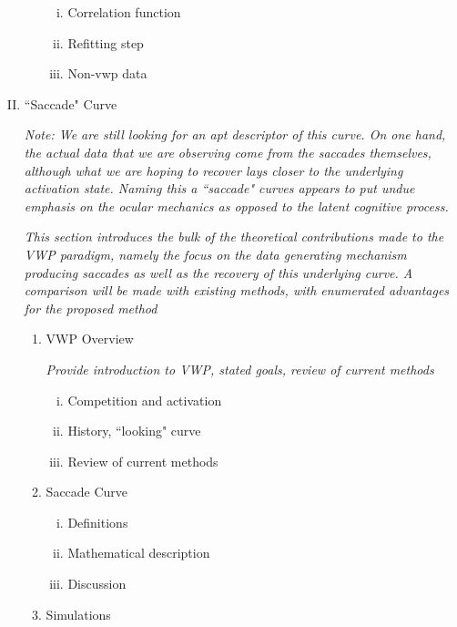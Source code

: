\documentclass[12pt, letterpaper, twoside]{article}
\begin{document}
\begin{enumerate}[I.]
\begin{enumerate}[1.]
    \begin{enumerate}[i.]
    \item Correlation function
    \item Refitting step
    \item Non-vwp data
    \end{enumerate}
  \end{enumerate}
\item ``Saccade" Curve

\textit{Note: We are still looking for an apt descriptor of this curve. On one hand, the actual data that we are observing come from the saccades themselves, although what we are hoping to recover lays closer to the underlying activation state. Naming this a ``saccade" curves appears to put undue emphasis on the ocular mechanics as opposed to the latent cognitive process. } 

\textit{This section introduces the bulk of the theoretical contributions made to the VWP paradigm, namely the focus on the data generating mechanism producing saccades as well as the recovery of this underlying curve. A comparison will be made with existing methods, with enumerated advantages for the proposed method}

  \begin{enumerate}[1.]
  \item VWP Overview

\textit{Provide introduction to VWP, stated goals, review of current methods}  
  
    \begin{enumerate}[i.]
    \item Competition and activation
    \item History, ``looking" curve
    \item Review of current methods
    \end{enumerate}
  \item Saccade Curve
    \begin{enumerate}[i.]
    \item Definitions
    \item Mathematical description
    \item Discussion
    \end{enumerate}
  \item Simulations 



\end{enumerate}
\end{enumerate}
\end{document}
